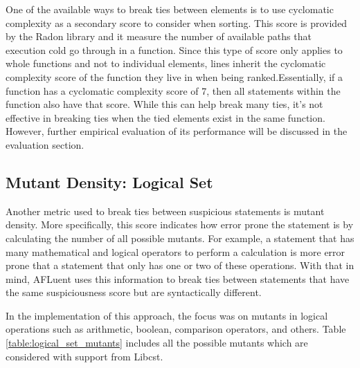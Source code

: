 One of the available ways to break ties between elements is to use cyclomatic
complexity as a secondary score to consider when sorting. This score is provided
by the Radon library and it measure the number of available paths that execution
cold go through in a function. Since this type of score only applies to whole
functions and not to individual elements, lines inherit the cyclomatic
complexity score of the function they live in when being ranked.Essentially, if
a function has a cyclomatic complexity score of 7, then all statements within
the function also have that score. While this can help break many ties, it's not
effective in breaking ties when the tied elements exist in the same function.
However, further empirical evaluation of its performance will be discussed in
the evaluation section.

\subsection{Mutant Density: Logical Set}
\label{subsec:tiebreak_mutant_density_logical}

Another metric used to break ties between suspicious statements is mutant
density. More specifically, this score indicates how error prone the statement
is by calculating the number of all possible mutants. For example, a statement
that has many mathematical and logical operators to perform a calculation is
more error prone that a statement that only has one or two of these operations.
With that in mind, AFLuent uses this information to break ties between
statements that have the same suspiciousness score but are syntactically
different.

In the implementation of this approach, the focus was on mutants in logical
operations such as arithmetic, boolean, comparison operators, and others.
Table \ref{table:logical_set_mutants} includes all the possible mutants which
are considered with support from Libcst.

